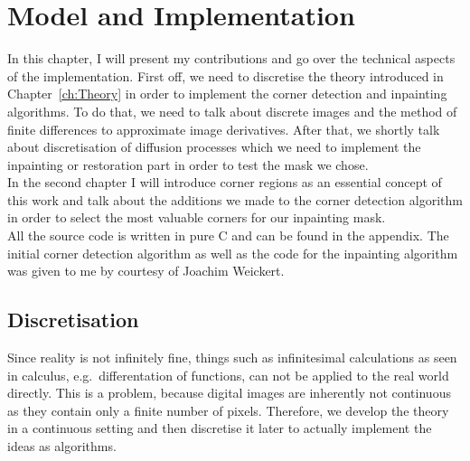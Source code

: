 \chapter{Model and Implementation}\label{ch:Implementation} 
In this chapter, I will present my contributions and go over the technical aspects of the
implementation. First off, we need to discretise the theory introduced in Chapter~\ref{ch:Theory} in order
to implement the corner detection and inpainting algorithms. To do that, we need to talk about
discrete images and the method of finite differences to approximate image derivatives.
After that, we shortly talk about discretisation of diffusion processes which we need to implement
the inpainting or restoration part in order to test the mask we chose.\\  
In the second chapter I will introduce corner regions as an essential concept of this work and talk
about the additions we made to the corner detection algorithm in order to select the most valuable
corners for our inpainting mask.\\
All the source code is written in pure C and can be found in the appendix.
The initial corner detection algorithm as well as the code for the inpainting algorithm was given
to me by courtesy of Joachim Weickert.

\section{Discretisation}\label{sec:Discretisation}
Since reality is not infinitely fine, things such as infinitesimal calculations as seen in 
calculus, e.g.\ differentation of functions, can not be applied to the real world directly.
This is a problem, because digital images are inherently not continuous as they contain only a
finite number of pixels. 
Therefore, we develop the theory in a continuous setting and then discretise it later to actually
implement the ideas as algorithms.

